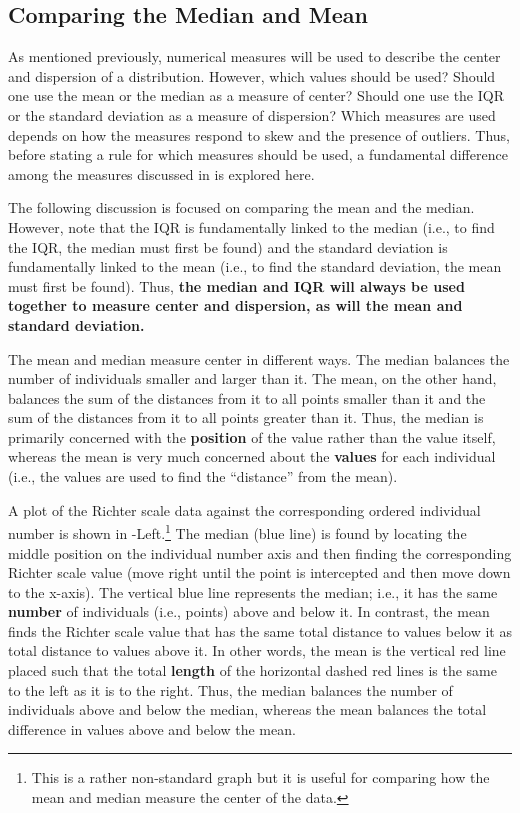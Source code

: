 \subsection{Comparing the Median and Mean} \label{sect:MeanMedian}
As mentioned previously, numerical measures will be used to describe the center and dispersion of a distribution. However, which values should be used? Should one use the mean or the median as a measure of center? Should one use the IQR or the standard deviation as a measure of dispersion? Which measures are used depends on how the measures respond to skew and the presence of outliers. Thus, before stating a rule for which measures should be used, a fundamental difference among the measures discussed in  is explored here.

The following discussion is focused on comparing the mean and the median. However, note that the IQR is fundamentally linked to the median (i.e., to find the IQR, the median must first be found) and the standard deviation is fundamentally linked to the mean (i.e., to find the standard deviation, the mean must first be found). Thus, \textbf{the median and IQR will always be used together to measure center and dispersion, as will the mean and standard deviation.}

The mean and median measure center in different ways. The median balances the number of individuals smaller and larger than it. The mean, on the other hand, balances the sum of the distances from it to all points smaller than it and the sum of the distances from it to all points greater than it. Thus, the median is primarily concerned with the \textbf{position} of the value rather than the value itself, whereas the mean is very much concerned about the \textbf{values} for each individual (i.e., the values are used to find the ``distance'' from the mean).


A plot of the Richter scale data against the corresponding ordered individual number is shown in -Left.\footnote{This is a rather non-standard graph but it is useful for comparing how the mean and median measure the center of the data.}  The median (blue line) is found by locating the middle position on the individual number axis and then finding the corresponding Richter scale value (move right until the point is intercepted and then move down to the x-axis). The vertical blue line represents the median; i.e., it has the same \textbf{number} of individuals (i.e., points) above and below it. In contrast, the mean finds the Richter scale value that has the same total distance to values below it as total distance to values above it. In other words, the mean is the vertical red line placed such that the total \textbf{length} of the horizontal dashed red lines is the same to the left as it is to the right. Thus, the median balances the number of individuals above and below the median, whereas the mean balances the total difference in values above and below the mean.

